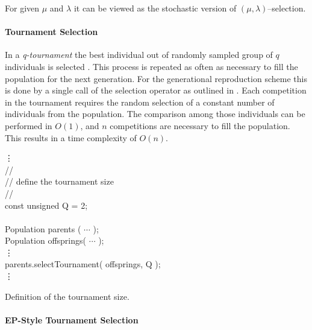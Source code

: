 For given $\mu$ and $\lambda$ it can be viewed as the stochastic
version of $(\mu,\lambda)$--selection.


        \paragraph{Tournament Selection}

In a \emph{q-tournament} the best individual out of randomly sampled
group of $q$ individuals is selected \cite{Goldberg:91}. This process
is repeated as often as necessary to fill the population for the next
generation.  For the generational reproduction scheme this is done by
a single call of the selection operator as outlined in
. Each competition in the
tournament requires the random selection of a constant number of
individuals from the population. The comparison among those
individuals can be performed in $O(1)$, and $n$ competitions are
necessary to fill the population. This results in a time complexity
of $O(n)$.

\begin{example}[htb]
\begin{shortlisting}
            \vdots\\
//\\
// {\rm define the tournament size}\\
//\\
const unsigned Q = 2;\\
\\
Population parents   ( $\cdots$ );\\
Population offsprings( $\cdots$ );\\
            \vdots\\
parents.selectTournament( offsprings, Q );\\
            \vdots\\
\end{shortlisting}
\vspace*{-10pt}\caption[Definition of the Tournament Size]{Definition of the
tournament size.\label{selection:example:tournament}}
\end{example}

        \paragraph{EP-Style Tournament Selection}

